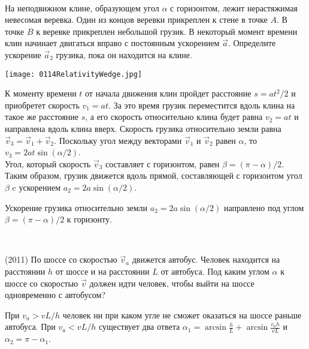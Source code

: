 \begin{ex}
\hspace{0pt} \\
\begin{minipage}{.65\textwidth}
На неподвижном клине, образующем угол $\alpha$  с горизонтом, лежит нерастяжимая невесомая веревка. Один из концов веревки прикреплен к стене в точке $A$. В точке $B$ к веревке прикреплен небольшой грузик. В некоторый момент времени клин начинает двигаться вправо с постоянным ускорением $\vec{a}$. Определите ускорение $\vec{a}_2$ грузика, пока он находится на клине.
\end{minipage}
\begin{minipage}{.35\textwidth}
\centering
\texttt{[image: 0114RelativityWedge.jpg]}
\end{minipage}
\begin{sol}
К моменту времени $t$ от начала движения клин пройдет расстояние $s = at^2/2$ и приобретет скорость $v_1 = at$. За это время грузик переместится вдоль клина на такое же расстояние $s$, а его скорость относительно клина будет равна $v_2 = at$ и направлена вдоль клина вверх. Скорость грузика относительно земли равна $\vec{v}_3 = \vec{v}_1 + \vec{v}_2$. Поскольку угол между векторами $\vec{v}_1$ и $\vec{v}_2$ равен $\alpha$, то $v_3 = 2at \sin (\alpha /2)$. \\ 
Угол, который скорость $\vec{v}_3$ составляет с горизонтом, равен $\beta  = (\pi - \alpha)/2$. Таким образом, грузик движется вдоль прямой, составляющей с горизонтом угол $\beta$ c ускорением $a_2 = 2a \sin (\alpha /2)$.
\end{sol}
\begin{ans}
Ускорение грузика относительно земли $a_2 = 2a \sin (\alpha /2)$ направлено под углом $\beta  = (\pi - \alpha)/2$ к горизонту.
\end{ans}
\end{ex}

\begin{ex}
\hspace{0pt} \\
\begin{minipage}{.65\textwidth}
(2011) По шоссе со скоростью $\vec{v}_a$ движется автобус. Человек находится на расстоянии $h$ от шоссе и на расстоянии $L$ от автобуса. 
Под каким углом $\alpha$ к шоссе со скоростью $\vec v$  должен идти человек, чтобы выйти на шоссе одновременно с автобусом?
\end{minipage}
\begin{minipage}{.35\textwidth}
\centering

\end{minipage}
\begin{ans}
При $v_a > vL/h$ человек ни при каком угле не сможет оказаться на шоссе раньше автобуса. При $v_a < vL/h$ существует два ответа $\alpha_1 = \arcsin \frac{h}{L} + \arcsin \frac{v_ah}{vL}$ и $\alpha_2 = \pi - \alpha_1$.
\end{ans}
\end{ex}


